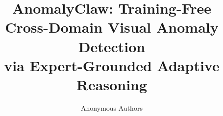 \documentclass{article}
\title{AnomalyClaw: Training-Free Cross-Domain Visual Anomaly Detection\\via Expert-Grounded Adaptive Reasoning}
\author{Anonymous Authors}
\theoremstyle{plain}
\theoremstyle{definition}
\theoremstyle{remark}
\begin{document}
\maketitle

\begin{abstract}

\end{abstract}











\newpage
\appendix

\end{document}
